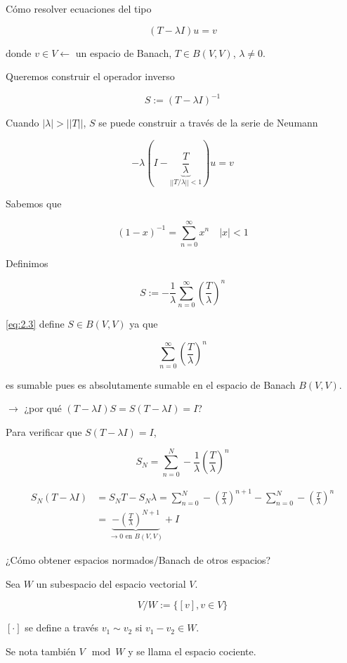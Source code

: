 Cómo resolver ecuaciones del tipo

\[(T-\lambda I)u=v\]

donde $v\in V\leftarrow$ un espacio de Banach, $T\in B(V,V)$, $\lambda\neq 0$.

Queremos construir el operador \color{red} inverso \color{black}

\[S:=(T-\lambda I)^{-1}\]

Cuando $|\lambda|>||T||$, $S$ se puede construir a través de la \color{red} serie de Neumann \color{black}

\[-\lambda (I-\underbrace{\frac{T}{\lambda}}_{||T/\lambda||<1})u=v\]

Sabemos que 

\[(1-x)^{-1}=\sum_{n=0}^\infty x^n\quad |x|<1\]

Definimos 

\begin{equation}S:=-\frac{1}{\lambda}\sum_{n=0}^\infty \left(\frac{T}{\lambda}\right)^n\label{eq:2.3}\end{equation}

\ref{eq:2.3} define $S\in B(V,V)$ ya que

\[\sum_{n=0}^\infty \left(\frac{T}{\lambda}\right)^n\]

es sumable pues es absolutamente sumable en el espacio de Banach $B(V,V)$.

$\rightarrow$ ¿por qué $(T-\lambda I)S=S(T-\lambda I)=I$?

Para verificar que $S(T-\lambda I)=I$, 

\[S_N=\sum_{n=0}^N -\frac{1}{\lambda} \left(\frac{T}{\lambda}\right)^n\]

\begin{align*}S_N(T-\lambda I)&=S_N T-S_N \lambda=\sum_{n=0}^N -\left(\frac{T}{\lambda}\right)^{n+1}-\sum_{n=0}^N -\left(\frac{T}{\lambda}\right)^{n}\\
&=\underbrace{-\left(\frac{T}{\lambda}\right)^{N+1}}_{\to 0 \text{ en }B(V,V)}+I\end{align*}

¿Cómo obtener espacios normados/Banach de otros espacios?

\begin{fdefinition}
    Sea $W$ un subespacio del espacio vectorial $V$.

    \[V/W:=\{[v],v\in V\}\]

    $[\cdot]$ se define a través $v_1\sim v_2$ si $v_1-v_2\in W$.

    Se nota también $V\mod W$ y se llama el espacio cociente.
\end{fdefinition}

